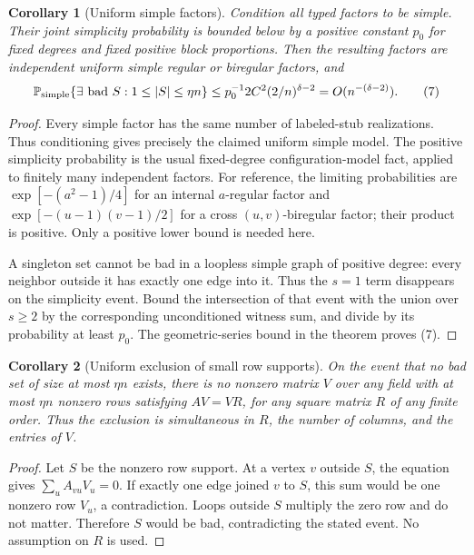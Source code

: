 \documentclass[11pt]{article}
\newtheorem{corollary}{Corollary}
\newcommand{\Prb}{\mathbb P}
\begin{document}
\begin{corollary}[Uniform simple factors]
Condition all typed factors to be simple. Their joint simplicity
probability is bounded below by a positive constant $p_0$ for fixed
degrees and fixed positive block proportions. Then the resulting factors
are independent uniform simple regular or biregular factors, and
\[
 \Prb_{\rm simple}\{\exists\hbox{ bad }S:
                    1\leq|S|\leq\eta n\}
 \leq p_0^{-1}2C^2(2/n)^{\delta-2}=O(n^{-(\delta-2)}).
 \tag{7}
\]
\end{corollary}
\begin{proof}
Every simple factor has the same number of labeled-stub realizations.
Thus conditioning gives precisely the claimed uniform simple model.
The positive simplicity probability is the usual fixed-degree
configuration-model fact, applied to finitely many independent factors.
For reference, the limiting probabilities are
$\exp[-(a^2-1)/4]$ for an internal $a$-regular factor and
$\exp[-(u-1)(v-1)/2]$ for a cross $(u,v)$-biregular factor; their product
is positive. Only a positive lower bound is needed here.

A singleton set cannot be bad in a loopless simple graph of positive
degree: every neighbor outside it has exactly one edge into it. Thus
the $s=1$ term disappears on the simplicity event. Bound the intersection
of that event with the union over $s\geq2$ by the corresponding
unconditioned witness sum, and divide by its probability at least $p_0$.
The geometric-series bound in the theorem proves (7).
\end{proof}

\begin{corollary}[Uniform exclusion of small row supports]
On the event that no bad set of size at most $\eta n$ exists, there is
no nonzero matrix $V$ over any field with at most $\eta n$ nonzero rows
satisfying $AV=VR$, for any square matrix $R$ of any finite order.
Thus the exclusion is simultaneous in $R$, the number of columns, and
the entries of $V$.
\end{corollary}
\begin{proof}
Let $S$ be the nonzero row support. At a vertex $v$ outside $S$, the
equation gives $\sum_uA_{vu}V_u=0$. If exactly one edge joined $v$ to
$S$, this sum would be one nonzero row $V_u$, a contradiction. Loops
outside $S$ multiply the zero row and do not matter. Therefore $S$ would
be bad, contradicting the stated event. No assumption on $R$ is used.
\end{proof}
\end{document}
